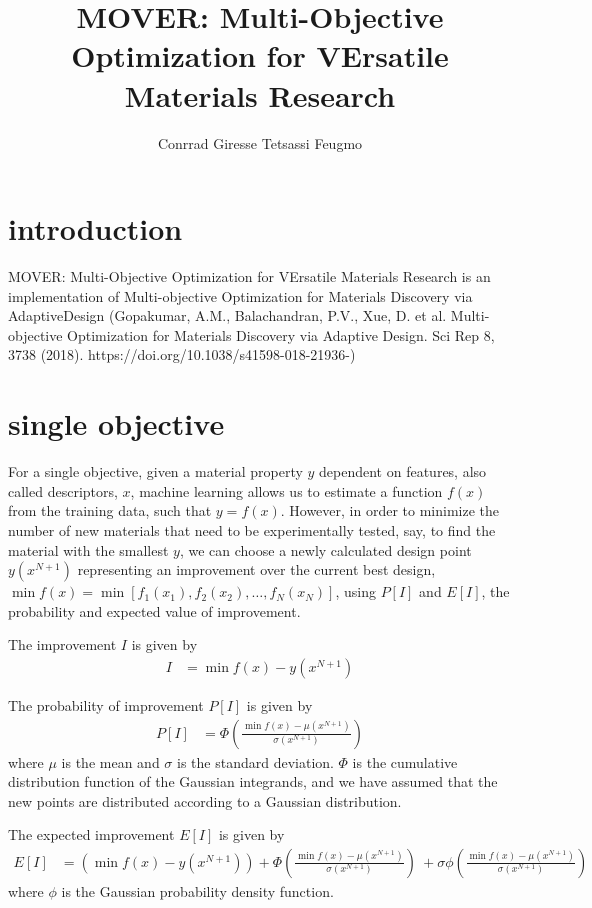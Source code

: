 \documentclass[12pt]{article}
\title{MOVER: Multi-Objective Optimization for VErsatile Materials Research}
\author{Conrrad Giresse Tetsassi Feugmo}
\begin{document}
\maketitle



\section{introduction}

MOVER: Multi-Objective Optimization for VErsatile Materials Research is an  implementation of Multi-objective Optimization for Materials Discovery via AdaptiveDesign (Gopakumar, A.M., Balachandran, P.V., Xue, D. et al. Multi-objective Optimization for Materials Discovery via Adaptive Design. Sci Rep 8, 3738 (2018). https://doi.org/10.1038/s41598-018-21936-)



\section{single objective}



	For a single objective, given a material property $y$ dependent on features, also called descriptors, $x$, machine learning allows us to estimate a function $f(x)$ from the training data, such that $y=f(x)$. However, in order to minimize the number of new materials that need to be experimentally tested, say, to find the material with the smallest $y$, we can choose a newly calculated design point $y(x^{N+1})$ representing an improvement over the current best design, $\min f(x)=\min[f_1(x_1), f_2(x_2),\dots, f_N(x_N)]$, using $P[I]$ and $E[I]$, the probability and expected value of improvement.

	The improvement $I$ is given by
	\begin{align*}
		I &= \min f(x) - y(x^{N+1})
	\end{align*}

	The probability of improvement $P[I]$ is given by
	\begin{align*}
		P[I] &= \Phi\left(\frac{\min f(x) - \mu(x^{N+1})}{\sigma(x^{N+1})}\right)
	\end{align*}
	where $\mu$ is the mean and $\sigma$ is the standard deviation. $\Phi$ is the cumulative distribution function of the Gaussian integrands, and we have assumed that the new points are distributed according to a Gaussian distribution.

	The expected improvement $E[I]$ is given by
	\begin{align*}
		E[I] &= \left(\min f(x) - y(x^{N+1})\right) + \Phi\left(\frac{\min f(x) - \mu(x^{N+1})}{\sigma(x^{N+1})}\right) \
		+ \sigma\phi\left(\frac{\min f(x) - \mu(x^{N+1})}{\sigma(x^{N+1})}\right)
	\end{align*}
	where $\phi$ is the Gaussian probability density function.
\end{document}
